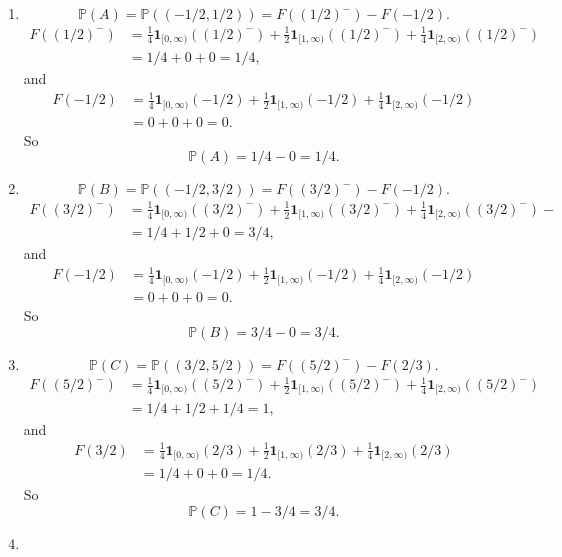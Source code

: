 \documentclass{article}
\newcommand{\bbp}{\mathbb{P}}
\begin{document}
\begin{enumerate}[(1)]
	\item 
		$$\bbp(A) = \bbp((-1/2,1/2)) = F((1/2)^-) - F(-1/2).$$
		\begin{align*}
		F((1/2)^-) &=  \frac{1}{4}\mathbf{1}_{[0, \infty)}((1/2)^-) + \frac{1}{2}\mathbf{1}_{[1,\infty)}((1/2)^-) + \frac{1}{4}\mathbf{1}_{[2,\infty)}((1/2)^-) \\
				 &	= 1/4+ 0+ 0  = 1/4,
		\end{align*}
		and
		\begin{align*}
        F(-1/2) &=  \frac{1}{4}\mathbf{1}_{[0, \infty)}(-1/2) + \frac{1}{2}\mathbf{1}_{[1,\infty)}(-1/2) + \frac{1}{4}\mathbf{1}_{[2,\infty)}(-1/2) \\
        			 &= 0 + 0 + 0 = 0.
        \end{align*}
        So
        $$\bbp(A) = 1/4 - 0 = 1/4.$$
	\item
		$$\bbp(B) = \bbp((-1/2,3/2)) = F((3/2)^-) - F(-1/2).$$
		\begin{align*}
		F((3/2)^-) &=  \frac{1}{4}\mathbf{1}_{[0, \infty)}((3/2)^-) + \frac{1}{2}\mathbf{1}_{[1,\infty)}((3/2)^-) + \frac{1}{4}\mathbf{1}_{[2,\infty)}((3/2)^-)- \\
			       &= 1/4+ 1/2+ 0  = 3/4,
		\end{align*}
		and
		\begin{align*}
        	F(-1/2) &=  \frac{1}{4}\mathbf{1}_{[0, \infty)}(-1/2) + \frac{1}{2}\mathbf{1}_{[1,\infty)}(-1/2) + \frac{1}{4}\mathbf{1}_{[2,\infty)}(-1/2) \\
        			&= 0 + 0 + 0 = 0.
        \end{align*}
        So
        $$\bbp(B) = 3/4 - 0 = 3/4.$$
	\item
		$$\bbp(C) = \bbp((3/2,5/2)) = F((5/2)^-) - F(2/3).$$
		\begin{align*}
			F((5/2)^-) &=  \frac{1}{4}\mathbf{1}_{[0, \infty)}((5/2)^-) + \frac{1}{2}\mathbf{1}_{[1,\infty)}((5/2)^-) + \frac{1}{4}\mathbf{1}_{[2,\infty)}((5/2)^-) \\
					   &= 1/4+ 1/2+ 1/4  = 1,
		\end{align*}
		and
		\begin{align*}
        	F(3/2) &=  \frac{1}{4}\mathbf{1}_{[0, \infty)}(2/3) + \frac{1}{2}\mathbf{1}_{[1,\infty)}(2/3) + \frac{1}{4}\mathbf{1}_{[2,\infty)}(2/3) \\
        		   &= 1/4 + 0 + 0 = 1/4.
        \end{align*}
        So
        $$\bbp(C) = 1 - 3/4 = 3/4.$$
	\item

\end{enumerate}
\end{document}
